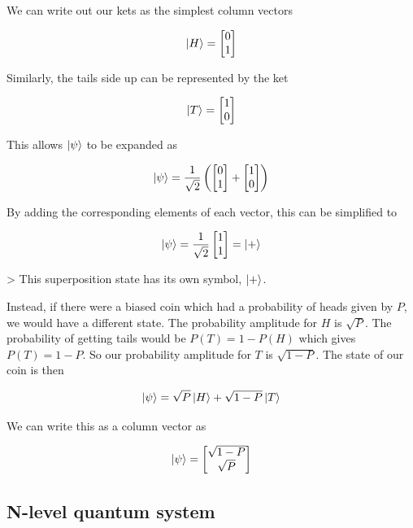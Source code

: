 We can write out our kets as the simplest column vectors

$$ \ket{H} = 
\begin{bmatrix}
0 \\ 1
\end{bmatrix} $$

Similarly, the tails side up can be represented by the ket

$$
\ket{T} = 
\begin{bmatrix}
1 \\ 0
\end{bmatrix} $$

This allows $\ket{\psi} $ to be expanded as 

$$ \ket{\psi} = \frac{1}{\sqrt{2}}\left(\begin{bmatrix}
0 \\ 1
\end{bmatrix}+ \begin{bmatrix}
1 \\ 0
\end{bmatrix}\right) $$

By adding the corresponding elements of each vector, this can be simplified to

$$ \ket{\psi} = \frac{1}{\sqrt{2}}\begin{bmatrix} 1 \\ 1 \end{bmatrix} = \ket{+}$$

> This superposition state has its own symbol, $\ket{+}$.

Instead, if there were a biased coin which had a probability of heads given by $P$, we would have a different state. The probability amplitude for $H$ is $\sqrt{P}$. The probability of getting tails would be $ P(T) = 1 - P(H)$ which gives $P(T) = 1 -P$. So our probability amplitude for $T$ is $\sqrt{1 - P}$. The state of our coin is then 

$$
\ket{\psi} = \sqrt{P}\ket{H} + \sqrt{1-P}\ket{T}
$$

We can write this as a column vector as

$$
\ket{\psi} = \begin{bmatrix}
\sqrt{1-P} \\ \sqrt{P}
\end{bmatrix}
$$

\subsection{N-level quantum system}

